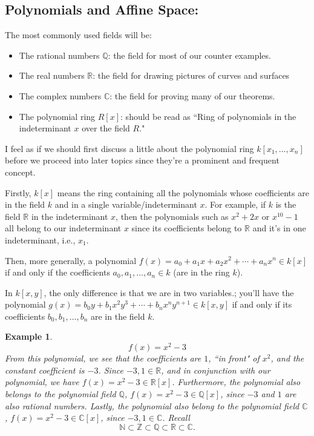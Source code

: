 \documentclass[12pt,reqno]{amsart}
\theoremstyle{plain}
\newtheorem{ex}{Example}
\newcommand{\rr}{\mathbb R}
\newcommand{\cc}{\mathbb C}
\newcommand{\nn}{\mathbb N}
\newcommand{\zz}{\mathbb Z}
\newcommand{\qq}{\mathbb Q}
\begin{document}
\subsection{Polynomials and Affine Space:} 


The most commonly used fields will be:
\begin{itemize}
\item The rational numbers $\qq$: the field for most of our counter examples.
\item The real numbers $\rr$: the field for drawing pictures of curves and surfaces
\item The complex numbers $\cc$: the field for proving many of our theorems. 
\item The polynomial ring $R[x]$: should be read as ``Ring of polynomials in the indeterminant $x$ over the field $R$."
\end{itemize}

I feel as if we should first discuss a little about the polynomial ring $k[x_1, \ldots , x_n]$ before we proceed into later topics since they're a prominent and frequent concept. 

 Firstly, $k[x]$ means the ring containing all the polynomials whose coefficients are in the field $k$ and in a single variable/indeterminant $x$. For example, if $k$ is the field $\rr$ in the indeterminant $x$, then the polynomials such as $x^2 + 2x$ or $x^{10} - 1$ all belong to our indeterminant $x$ since its coefficients belong to $\rr$ and it's in one indeterminant, i.e., $x_1$. 

Then, more generally, a polynomial $f(x) = a_0 + a_1 x + a_2 x^2 + \cdots + a_n x^n \in k[x]$ if and only if the coefficients $a_0, a_1, \ldots, a_n \in k$ (are in the ring $k$).

In $k[x,y]$, the only difference is that we are in two variables.; you'll have the polynomial $g(x) = b_0 y + b_1 x^2 y^3 + \cdots + b_n x^n y^{n+1} \in k[x, y]$ if and only if its coefficients $b_0, b_1, \ldots, b_n$ are in the field $k$.  

\begin{ex} $$f(x) = x^2 - 3$$ From this polynomial, we see that the coefficients are $1$, ``in front" of $x^2$, and the constant coefficient is $-3$. Since $ -3, 1 \in \rr$, and in conjunction with our polynomial, we have $f(x) = x^2 - 3 \in \rr[x]$. Furthermore, the polynomial also belongs to the polynomial field $\qq$,  $f(x) = x^2 - 3 \in \qq[x]$, since $-3$ and $1$ are also rational numbers. Lastly, the polynomial also belong to the polynomial field $\cc$, $f(x) = x^2 - 3 \in \cc[x]$, since $-3, 1 \in \cc$. Recall $$\nn \subset \zz \subset \qq \subset \rr \subset \cc .$$
\end{ex}
\end{document}
